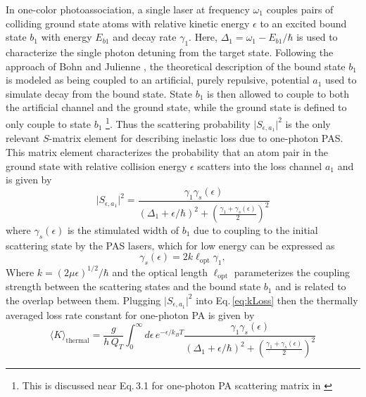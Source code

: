 In one-color photoassociation, a single laser at frequency $\omega_1$ couples pairs of colliding ground state atoms with relative kinetic energy $\epsilon$ to an excited bound state $b_1$ with energy $E_{b1}$ and decay rate $\gamma_1$.
Here, $\Delta_1 = \omega_1 - E_{b1}/\hbar$ is used to characterize the single photon detuning from the target state.
Following the approach of Bohn and Julienne \cite{Bohn1999}, the theoretical description of the bound state $b_1$ is modeled as being coupled to an artificial, purely repulsive, potential $a_1$ used to simulate decay from the bound state.
State $b_1$ is then allowed to couple to both the artificial channel and the ground state, while the ground state is defined to only couple to state $b_1$ \footnote{This is discussed near Eq.\,3.1 for one-photon PA scattering matrix in \cite{Bohn1999}}.
Thus the scattering probability $\vert S_{\epsilon, a_1} \vert^2$ is the only relevant $S$-matrix element for describing inelastic loss due to one-photon PAS.
This matrix element characterizes the probability that an atom pair in the ground state with relative collision energy $\epsilon$ scatters into the loss channel $a_1$ and is given by
\begin{equation}
	\vert  S_{\epsilon, a_1} \vert^2 = \frac{\gamma_1 \gamma_s(\epsilon)}{(\Delta_1 + \epsilon/ \hbar)^2 + \left( \frac{\gamma_1 + \gamma_s(\epsilon)}{2} \right)^2}
\end{equation}
where ${\gamma}_{s}(\epsilon)$ is the stimulated width of $b_1$ due to coupling to the initial scattering state by the PAS lasers, which for low energy can be expressed as \cite{ctj06,Borkowski2014a,Pachomov2017,Pachomow2017a}
\begin{equation}\label{3equationstimulatedwidth}
	{\gamma}_{s}(\epsilon) = 2 k \ell_{\text{opt}} \gamma_1,
\end{equation}
Where $k=(2\mu \epsilon)^{1/2}/\hbar$ and the optical length $\ell_{\text{opt}}$ parameterizes the coupling strength between the scattering states and the bound state $b_1$ and is related to the overlap between them.
Plugging $\vert S_{\epsilon, a_1} \vert^2$ into Eq.\,\ref{eq:kLoss} then the thermally averaged loss rate constant for one-photon PA is given by
\begin{equation} \label{eq:onePhotonK}
	\langle K \rangle_\text{thermal} = \frac{g}{h\,Q_{T}} \int_{0}^{\infty} d\epsilon \,e^{-\epsilon/k_{B}T} \frac{\gamma_1 \gamma_s(\epsilon)}{(\Delta_1 + \epsilon/ \hbar)^2 + \left( \frac{\gamma_1 + \gamma_s(\epsilon)}{2} \right)^2} 
\end{equation}

